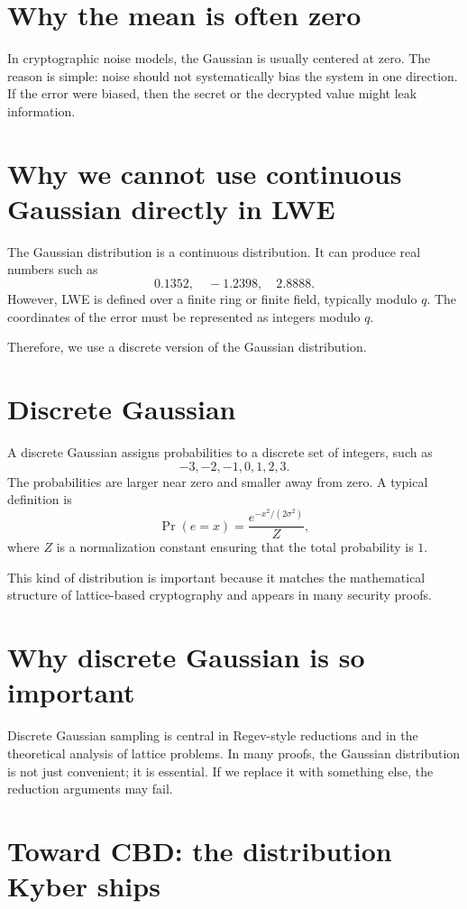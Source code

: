 \section{Why the mean is often zero}

In cryptographic noise models, the Gaussian is usually centered at zero. The reason is simple: noise should not systematically bias the system in one direction. If the error were biased, then the secret or the decrypted value might leak information.

\section{Why we cannot use continuous Gaussian directly in LWE}

The Gaussian distribution is a continuous distribution. It can produce real numbers such as
\[
0.1352,
\quad -1.2398,
\quad 2.8888.
\]
However, LWE is defined over a finite ring or finite field, typically modulo $q$. The coordinates of the error must be represented as integers modulo $q$.

Therefore, we use a discrete version of the Gaussian distribution.

\section{Discrete Gaussian}

A discrete Gaussian assigns probabilities to a discrete set of integers, such as
\[
-3,-2,-1,0,1,2,3.
\]
The probabilities are larger near zero and smaller away from zero. A typical definition is
\[
\Pr(e=x) = \frac{e^{-x^2/(2\sigma^2)}}{Z},
\]
where $Z$ is a normalization constant ensuring that the total probability is $1$.

This kind of distribution is important because it matches the mathematical structure of lattice-based cryptography and appears in many security proofs.

\section{Why discrete Gaussian is so important}

Discrete Gaussian sampling is central in Regev-style reductions and in the theoretical analysis of lattice problems. In many proofs, the Gaussian distribution is not just convenient; it is essential. If we replace it with something else, the reduction arguments may fail.

\section{Toward CBD: the distribution Kyber ships}

